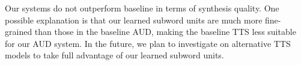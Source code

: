 \documentclass[a4paper]{article}
\begin{document}
Our systems do not outperform baseline in terms of synthesis quality. One possible explanation is that our learned subword units are much more fine-grained than those in the baseline AUD, making the baseline TTS  less suitable for our AUD system. In the future, we plan to investigate on alternative TTS models to take full advantage of our learned subword units.



\end{document}
